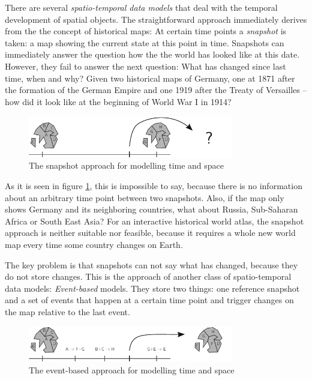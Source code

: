 There are several \emph{spatio-temporal data models} that deal with the temporal development of spatial objects. The straightforward approach immediately derives from the the concept of historical maps: At certain time points a \emph{snapshot} is taken: a map showing the current state at this point in time. Snapshots can immediately answer the question how the the world has looked like at this date. However, they fail to answer the next question: What has changed since last time, when and why? Given two historical maps of Germany, one at 1871 after the formation of the German Empire and one 1919 after the Treaty of Versailles -- how did it look like at the beginning of World War I in 1914?

\begin{figure}[H]
  \vspace{1em}
  \centering
  \includegraphics[width=0.8\textwidth]{graphics/introduction/snapshot_approach}
  \caption{The snapshot approach for modelling time and space}
  \label{fig:snapshot_approach}
\end{figure}

As it is seen in figure \ref{fig:snapshot_approach}, this is impossible to say, because there is no information about an arbitrary time point between two snapshots. Also, if the map only shows Germany and its neighboring countries, what about Russia, Sub-Saharan Africa or South East Asia? For an interactive historical world atlas, the snapshot approach is neither suitable nor feasible, because it requires a whole new world map every time some country changes on Earth.

The key problem is that snapshots can not say what has changed, because they do not store changes. This is the approach of another class of spatio-temporal data models: \emph{Event-based} models. They store two things: one reference snapshot and a set of events that happen at a certain time point and trigger changes on the map relative to the last event.

\begin{figure}[H]
  \vspace{1em}
  \centering
  \includegraphics[width=0.8\textwidth]{graphics/introduction/event_based_approach}
  \caption{The event-based approach for modelling time and space}
  \label{fig:event_based_approach}
\end{figure}

